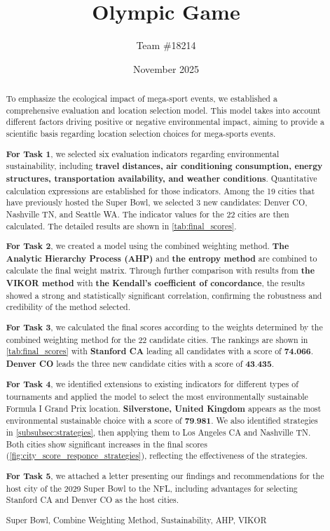 \documentclass{mcmthesis}
\title{Olympic Game}
\author{\small Team \#18214}
\date{November 2025}
\begin{document}
\begin{abstract}  

To emphasize the ecological impact of mega-sport events, we established a comprehensive evaluation and location selection model. This model takes into account different factors driving positive or negative environmental impact, aiming to provide a scientific basis regarding location selection choices for mega-sports events. 

\textbf{For Task 1}, we selected six evaluation indicators regarding environmental sustainability, including\textbf{ travel distances, air conditioning consumption, energy structures, transportation availability, and weather conditions}. Quantitative calculation expressions are established for those indicators. Among the 19 cities that have previously hosted the Super Bowl, we selected 3 new candidates: Denver CO, Nashville TN, and Seattle WA. The indicator values for the 22 cities are then calculated. The detailed results are shown in \cref{tab:final_scores}. 

\textbf{For Task 2}, we created a model using the combined weighting method. \textbf{The Analytic Hierarchy Process (AHP)} and\textbf{ the entropy method} are combined to calculate the final weight matrix. Through further comparison with results from \textbf{the VIKOR method} with \textbf{the Kendall's coefficient of concordance}, the results showed a strong and statistically significant correlation, confirming the robustness and credibility of the method selected. 

\textbf{For Task 3}, we calculated the final scores according to the weights determined by the combined weighting method for the 22 candidate cities. The rankings are shown in \cref{tab:final_scores} with \textbf{Stanford CA} leading all candidates with a score of \textbf{74.066}. \textbf{Denver CO} leads the three new candidate cities with a score of $\textbf{43.435}$. 

\textbf{For Task 4}, we identified extensions to existing indicators for different types of tournaments and applied the model to select the most environmentally sustainable Formula I Grand Prix location. \textbf{Silverstone, United Kingdom} appears as the most environmental sustainable choice with a score of $\textbf{79.981}$. We also identified strategies in \cref{subsubsec:strategies}, then applying them to Los Angeles CA and Nashville TN. Both cities show significant increases in the final scores (\cref{fig:city_score_responce_strategies}), reflecting the effectiveness of the strategies.  

\textbf{For Task 5}, we attached a letter presenting our findings and recommendations for the host city of the 2029 Super Bowl to the NFL, including advantages for selecting Stanford CA and Denver CO as the host cities. 

\begin{keywords}  
Super Bowl, Combine Weighting Method, Sustainability, AHP, VIKOR
\end{keywords} 
\end{abstract}
\maketitle
\end{document}
